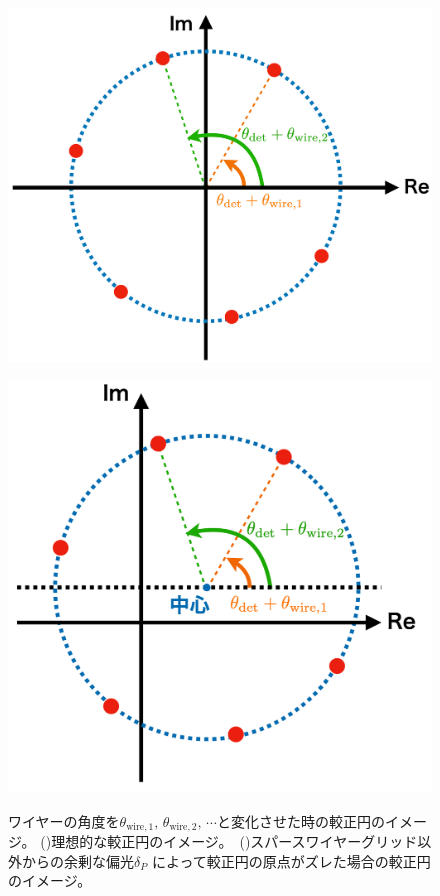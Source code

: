 \documentclass[../../main.tex]{subfiles}
\begin{document}
\begin{figure}[H]
    \begin{minipage}[b]{0.48\columnwidth}
        \centering
        \includegraphics[width=1.0\columnwidth]{wiregrid/wiregrid_calibration_circle.pdf}
        \subcaption{}
        \label{fig:calibration_circle1}
    \end{minipage}
    \hspace{0.02\columnwidth}
    \begin{minipage}[b]{0.48\columnwidth}
        \centering
        \includegraphics[width=0.85\columnwidth]{wiregrid/wiregrid_kouseien2.png}
        \subcaption{}
        \label{fig:calibration_circle2}
    \end{minipage}
    \caption{ワイヤーの角度を$\theta_{\mathrm{wire,1}},\,\theta_{\mathrm{wire,2}},\,\cdots$と変化させた時の較正円のイメージ。
    ()理想的な較正円のイメージ。\ 
    ()スパースワイヤーグリッド以外からの余剰な偏光$\delta_{P}$
    によって較正円の原点がズレた場合の較正円のイメージ。
    }
    \label{fig:calibration_circle}
\end{figure}
\end{document}
